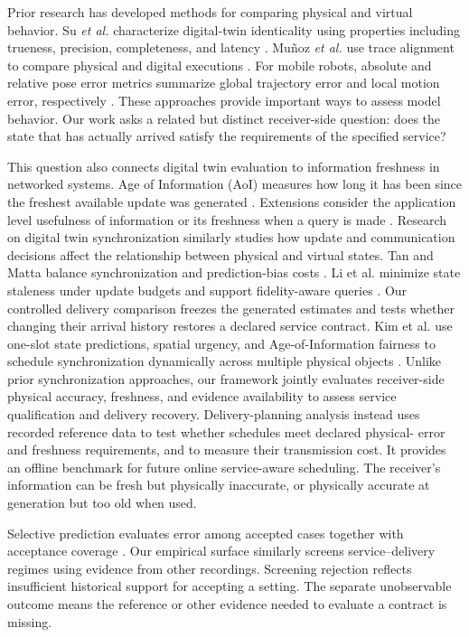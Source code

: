 \documentclass[journal]{IEEEtran}
\newcommand{\new}[1]{#1}
\begin{document}
Prior research has developed methods for comparing physical and virtual
behavior. Su \emph{et al.} characterize digital-twin identicality using
properties including trueness, precision, completeness, and latency
\cite{su2023identicality}. Mu{\~n}oz \emph{et al.} use trace alignment to
compare physical and digital executions \cite{munoz2024trace}. For mobile robots,
absolute and relative pose error metrics summarize global trajectory
error and local motion error, respectively \cite{sturm2012rgbd}. These
approaches provide important ways to assess model behavior. Our work asks
a related but distinct receiver-side question: does the state that has
actually arrived satisfy the requirements of the specified service?

This question also connects digital twin evaluation to information
freshness in networked systems. Age of Information (AoI) measures how
long it has been since the freshest available update was generated
\cite{kaul2012realtime,yates2021aoi}. Extensions consider the
application level usefulness of information or its freshness when a
query is made \cite{maatouk2023aoii,chiariotti2022query}. Research on
digital twin synchronization similarly studies how update and
communication decisions affect the relationship between physical and
virtual states. \new{Tan and Matta balance synchronization and prediction-bias
costs \cite{tan2024synchronization}.
Li et al. minimize state staleness
under update budgets and support fidelity-aware queries
\cite{li2025budget}. Our controlled delivery comparison freezes the
generated estimates and tests whether changing their arrival history
restores a declared service contract.} \new{Kim et al. use one-slot
state predictions, spatial urgency, and Age-of-Information fairness to
schedule synchronization dynamically across multiple physical objects
\cite{kim2026prediction}. Unlike prior synchronization approaches, our framework jointly evaluates receiver-side physical accuracy, freshness, and evidence availability to assess service qualification and delivery recovery. Delivery-planning analysis instead uses
recorded reference data to test whether schedules meet declared physical-
error and freshness requirements, and to measure their transmission
cost. It provides an offline benchmark for future online service-aware
scheduling.} The receiver's information can be fresh but physically
inaccurate, or physically accurate at generation but too old when used.

Selective prediction evaluates error among accepted cases together with
acceptance coverage \cite{elyaniv2010selective,geifman2019selectivenet}.
Our empirical surface similarly screens service--delivery regimes using
evidence from other recordings. \new{Screening rejection reflects
insufficient historical support for accepting a setting. The separate
unobservable outcome means the reference or other evidence needed to
evaluate a contract is missing.}
\end{document}
